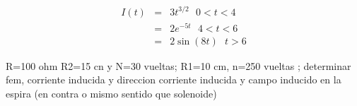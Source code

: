 \documentclass{article}
\begin{document}
\begin{eqnarray*}
I(t) &=&3t^{3/2}~\ \ 0<t<4 \\
&=&2e^{-5t}\text{ \ }4<t<6 \\
&=&2\sin (8t)\text{ \ }t>6
\end{eqnarray*}

\bigskip 

R=100 ohm R2=15 cn y N=30 vueltas;  R1=10 cm, n=250 vueltas ; determinar
fem, corriente inducida y direccion corriente inducida y campo inducido en
la espira (en contra o mismo sentido que solenoide)
\end{document}
